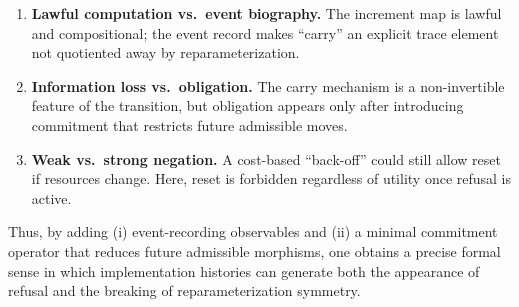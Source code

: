\documentclass[11pt]{article}
\begin{document}
\begin{enumerate}
\item \textbf{Lawful computation vs.\ event biography.}
The increment map is lawful and compositional; the event record makes ``carry''
an explicit trace element not quotiented away by reparameterization.

\item \textbf{Information loss vs.\ obligation.}
The carry mechanism is a non-invertible feature of the transition, but obligation
appears only after introducing commitment that restricts future admissible moves.

\item \textbf{Weak vs.\ strong negation.}
A cost-based ``back-off'' could still allow reset if resources change.
Here, reset is forbidden regardless of utility once refusal is active.
\end{enumerate}

Thus, by adding (i) event-recording observables and (ii) a minimal commitment
operator that reduces future admissible morphisms, one obtains a precise formal
sense in which implementation histories can generate both the appearance of
refusal and the breaking of reparameterization symmetry.
\end{document}
